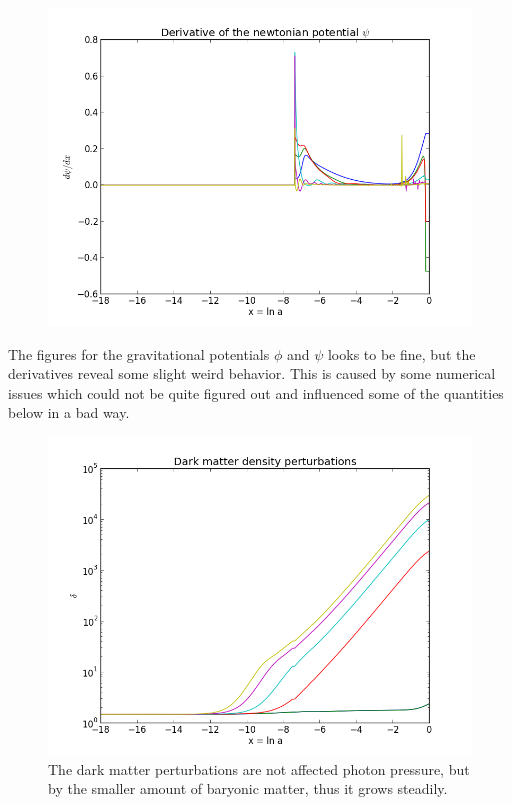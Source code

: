 \documentclass[norsk,a4paper,12pt]{article}
\begin{document}
\begin{figure}[H] 
\begin{center} 
\includegraphics[scale=0.5]{dpsi.png} 
  
\caption{} 
\end{center} 
\end{figure}

The figures for the gravitational potentials $\phi$ and $\psi$ looks to be fine, but the derivatives reveal some slight weird behavior. This is caused by some numerical issues which could not be quite figured out and influenced some of the quantities below in a bad way.

\begin{figure}[H] 
\begin{center} 
\includegraphics[scale=0.5]{delta.png} 
 

\caption{The dark matter perturbations are not affected photon pressure, but by the smaller amount of baryonic matter, thus it grows steadily.} 
\end{center} 
\end{figure}
\end{document}
